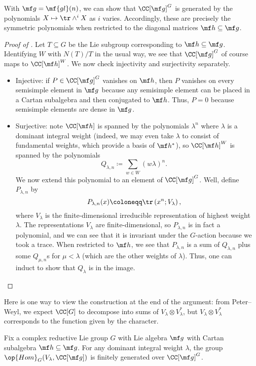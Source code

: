 \documentclass[../notes.tex]{subfiles}
\begin{document}
\begin{example}
	With $\mf g=\mf{gl}(n)$, we can show that $\CC[\mf g]^G$ is generated by the polynomials $X\mapsto\tr\land^iX$ as $i$ varies. Accordingly, these are precisely the symmetric polynomials when restricted to the diagonal matrices $\mf h\subseteq\mf g$.
\end{example}
\begin{proof}[Proof of ]
	Let $T\subseteq G$ be the Lie subgroup corresponding to $\mf h\subseteq\mf g$. Identifying $W$ with $N(T)/T$ in the usual way, we see that $\CC[\mf g]^G$ of course maps to $\CC[\mf h]^W$. We now check injectivity and surjectivity separately.
	\begin{itemize}
		\item Injective: if $P\in\CC[\mf g]^G$ vanishes on $\mf h$, then $P$ vanishes on every semisimple element in $\mf g$ because any semisimple element can be placed in a Cartan subalgebra and then conjugated to $\mf h$. Thus, $P=0$ because semisimple elements are dense in $\mf g$.
		\item Surjective: note $\CC[\mf h]$ is spanned by the polynomials $\lambda^n$ where $\lambda$ is a dominant integral weight (indeed, we may even take $\lambda$ to consist of fundamental weights, which provide a basis of $\mf h^*$), so $\CC[\mf h]^W$ is spanned by the polynomials
		\[Q_{\lambda,n}\coloneqq\sum_{w\in W}(w\lambda)^n.\]
		We now extend this polynomial to an element of $\CC[\mf g]^G$. Well, define $P_{\lambda,n}$ by
		\[P_{\lambda,n}(x)\coloneqq\tr\left(x^n;V_\lambda\right),\]
		where $V_\lambda$ is the finite-dimensional irreducible representation of highest weight $\lambda$. The representations $V_\lambda$ are finite-dimensional, so $P_{\lambda,n}$ is in fact a polynomial, and we can see that it is invariant under the $G$-action because we took a trace. When restricted to $\mf h$, we see that $P_{\lambda,n}$ is a sum of $Q_{\lambda,n}$ plus some $Q_{\mu,n}$s for $\mu<\lambda$ (which are the other weights of $\lambda$). Thus, one can induct to show that $Q_\lambda$ is in the image.
		\qedhere
	\end{itemize}
\end{proof}
\begin{remark}
	Here is one way to view the construction at the end of the argument: from Peter--Weyl, we expect $\CC[G]$ to decompose into sums of $V_\lambda\otimes V_\lambda^*$, but $V_\lambda\otimes V_\lambda^*$ corresponds to the function given by the character.
\end{remark}
\begin{corollary} \label{cor:apply-chev-res}
	Fix a complex reductive Lie group $G$ with Lie algebra $\mf g$ with Cartan subalgebra $\mf h\subseteq\mf g$. For any dominant integral weight $\lambda$, the group $\op{Hom}_G(V_\lambda,\CC[\mf g])$ is finitely generated over $\CC[\mf g]^G$.
\end{corollary}
\end{document}
